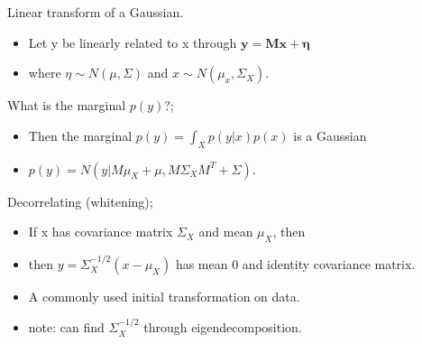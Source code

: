 \documentclass{article}
\begin{document}
Linear transform of a Gaussian. \begin{itemize} \item Let y be linearly related to x through $\mathbf{y = Mx + \eta}$ \item where $\eta \sim N(\mu, \Sigma)$ and $x\sim N(\mu_x, \Sigma_X)$. \end{itemize} What is the marginal $p(y)$?; \begin{itemize}\item Then the marginal $p(y)=\int_X p(y|x)p(x)$ is a Gaussian \item $p(y) = N(y|M\mu_X + \mu, M\Sigma_XM^T+\Sigma)$. \end{itemize}

Decorrelating (whitening); \begin{itemize} \item If x has covariance matrix $\Sigma_X$ and mean $\mu_X$, then  \item then $y=\Sigma_X^{-1/2}(x-\mu_X)$ has mean 0 and identity covariance matrix. \item A commonly used initial transformation on data. \item note: can find $\Sigma_X^{-1/2}$ through eigendecomposition. \end{itemize}
\end{document}
